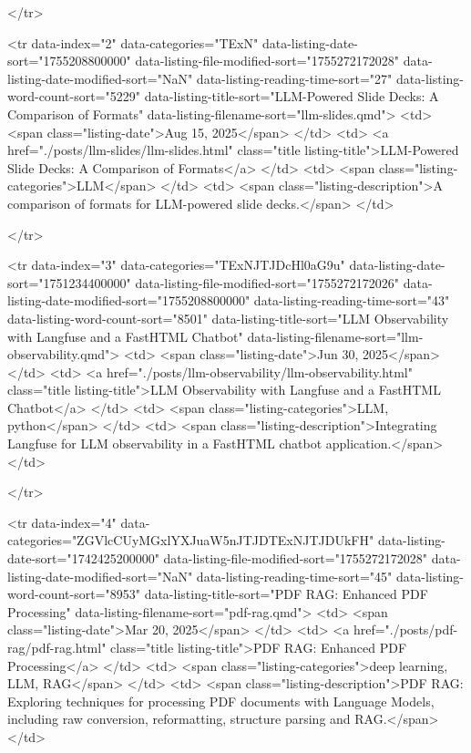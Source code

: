 </tr>

<tr data-index="2" data-categories="TExN" data-listing-date-sort="1755208800000" data-listing-file-modified-sort="1755272172028" data-listing-date-modified-sort="NaN" data-listing-reading-time-sort="27" data-listing-word-count-sort="5229" data-listing-title-sort="LLM-Powered Slide Decks: A Comparison of Formats" data-listing-filename-sort="llm-slides.qmd">
<td>
<span class="listing-date">Aug 15, 2025</span>
</td>
<td>
<a href="./posts/llm-slides/llm-slides.html" class="title listing-title">LLM-Powered Slide Decks: A Comparison of Formats</a>
</td>
<td>
<span class="listing-categories">LLM</span>
</td>
<td>
<span class="listing-description">A comparison of formats for LLM-powered slide decks.</span>
</td>

</tr>

<tr data-index="3" data-categories="TExNJTJDcHl0aG9u" data-listing-date-sort="1751234400000" data-listing-file-modified-sort="1755272172026" data-listing-date-modified-sort="1755208800000" data-listing-reading-time-sort="43" data-listing-word-count-sort="8501" data-listing-title-sort="LLM Observability with Langfuse and a FastHTML Chatbot" data-listing-filename-sort="llm-observability.qmd">
<td>
<span class="listing-date">Jun 30, 2025</span>
</td>
<td>
<a href="./posts/llm-observability/llm-observability.html" class="title listing-title">LLM Observability with Langfuse and a FastHTML Chatbot</a>
</td>
<td>
<span class="listing-categories">LLM, python</span>
</td>
<td>
<span class="listing-description">Integrating Langfuse for LLM observability in a FastHTML chatbot application.</span>
</td>

</tr>

<tr data-index="4" data-categories="ZGVlcCUyMGxlYXJuaW5nJTJDTExNJTJDUkFH" data-listing-date-sort="1742425200000" data-listing-file-modified-sort="1755272172028" data-listing-date-modified-sort="NaN" data-listing-reading-time-sort="45" data-listing-word-count-sort="8953" data-listing-title-sort="PDF RAG: Enhanced PDF Processing" data-listing-filename-sort="pdf-rag.qmd">
<td>
<span class="listing-date">Mar 20, 2025</span>
</td>
<td>
<a href="./posts/pdf-rag/pdf-rag.html" class="title listing-title">PDF RAG: Enhanced PDF Processing</a>
</td>
<td>
<span class="listing-categories">deep learning, LLM, RAG</span>
</td>
<td>
<span class="listing-description">PDF RAG: Exploring techniques for processing PDF documents with Language Models, including raw conversion, reformatting, structure parsing and RAG.</span>
</td>

